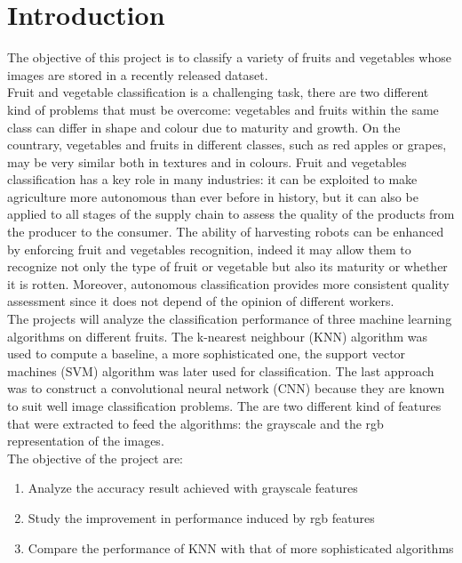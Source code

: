 \documentclass{article}
\begin{document}
\section{Introduction}
The objective of this project is to classify a variety of fruits and vegetables whose images are stored in a recently released dataset.\\
Fruit and vegetable classification is a challenging task, there are two different kind of problems that must be overcome: vegetables and fruits within the same class can differ in shape and colour due to maturity and growth. On the countrary, vegetables and fruits in different classes, such as red apples or grapes, may be very similar both in textures and in colours. 
Fruit and vegetables classification has a key role in many industries: it can be exploited to make agriculture more autonomous than ever before in history, but it can also be applied to all stages of the supply chain to assess the quality of the products from the producer to the consumer. 
The ability of harvesting robots can be enhanced by enforcing fruit and vegetables recognition, indeed it may allow them to recognize not only the type of fruit or vegetable but also its maturity or whether it is rotten. Moreover, autonomous classification provides more consistent quality assessment since it does not depend of the opinion of different workers.
\\
The projects will analyze the classification performance of three machine learning algorithms on different fruits. The k-nearest neighbour (KNN) algorithm was used to compute a baseline, a more sophisticated one, the support vector machines (SVM) algorithm was later used for classification. The last approach was to construct a convolutional neural network (CNN) because they are known to suit well image classification problems. The are two different kind of features that were extracted to feed the algorithms: the grayscale and the rgb representation of the images.\\
The objective of the project are:
\begin{enumerate}
\item Analyze the accuracy result achieved with grayscale features
\item Study the improvement in performance induced by rgb features
\item Compare the performance of KNN with that of more sophisticated algorithms
\end{enumerate}
\end{document}
